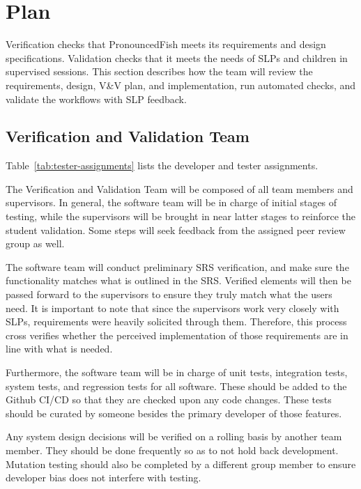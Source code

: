 \documentclass[12pt, titlepage]{article}
\begin{document}
\section{Plan}

Verification checks that PronouncedFish meets its requirements and design
specifications. Validation checks that it meets the needs of SLPs and
children in supervised sessions. This section describes how the team will
review the requirements, design, V\&V plan, and implementation, run automated
checks, and validate the workflows with SLP feedback.

\subsection{Verification and Validation Team}

Table~\ref{tab:tester-assignments} lists the developer and tester assignments.

The Verification and Validation Team will be composed of all team members 
and supervisors. In general, the software team will be in charge of initial 
stages of testing, while the supervisors will be brought in near latter stages 
to reinforce the student validation. Some steps will seek feedback from the 
assigned peer review group as well. 

The software team will conduct preliminary SRS verification, and make sure the
functionality matches what is outlined in the SRS. Verified elements will 
then be passed forward to the supervisors to ensure they truly match what 
the users need. It is important to note that since the supervisors work very 
closely with SLPs, requirements were heavily solicited through them. 
Therefore, this process cross verifies whether the perceived implementation 
of those requirements are in line with what is needed. 

Furthermore, the software team will be in charge of unit tests, integration 
tests, system tests, and regression tests for all software. These should be 
added to the Github CI/CD so that they are checked upon any code changes. 
These tests should be curated by someone besides the primary developer of 
those features. 

Any system design decisions will be verified on a rolling basis by another 
team member. They should be done frequently so as to not hold back development. 
Mutation testing should also be completed by a different group member to 
ensure developer bias does not interfere with testing.
\end{document}
